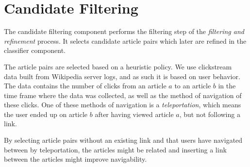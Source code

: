 \section{Candidate Filtering}
The candidate filtering component performs the filtering step of the \emph{filtering and refinement} process. It selects candidate article pairs which later are refined in the classifier component.

The article pairs are selected based on a heuristic policy. We use clickstream~\cite{wiki-clickstream} data built from Wikipedia server logs, and as such it is based on user behavior. The data contains the number of clicks from an article $a$ to an article $b$ in the time frame where the data was collected, as well as the method of navigation of these clicks. One of these methods of navigation is a \emph{teleportation}, which means the user ended up on article $b$ after having viewed article $a$, but not following a link. 

By selecting article pairs without an existing link and that users have navigated between by teleportation, the articles might be related and inserting a link between the articles might improve navigability.



